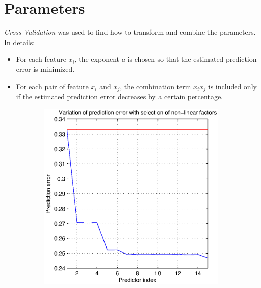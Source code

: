 \documentclass[a4paper, 11pt]{article}
\begin{document}
\section{Parameters}
\emph{Cross Validation} was used to find how to transform and combine the parameters. In details:
\begin{itemize}
\item For each feature $x_i$, the exponent $a$ is chosen so that the estimated prediction error is minimized.
\item For each pair of feature $x_i$ and $x_j$, the combination term $x_i x_j$ is included only if the estimated prediction error decreases by a certain percentage.  
\end{itemize}
\begin{figure}[h!]
        \centering
        \begin{subfigure}[b]{0.375\textwidth}
                \includegraphics[width=\textwidth]{../figures/nonLinearFactors.eps}
                \label{fig:tiger}
        \end{subfigure}
        ~ %
        \begin{subfigure}[b]{0.375\textwidth}

\end{subfigure}
\end{figure}
\end{document}
